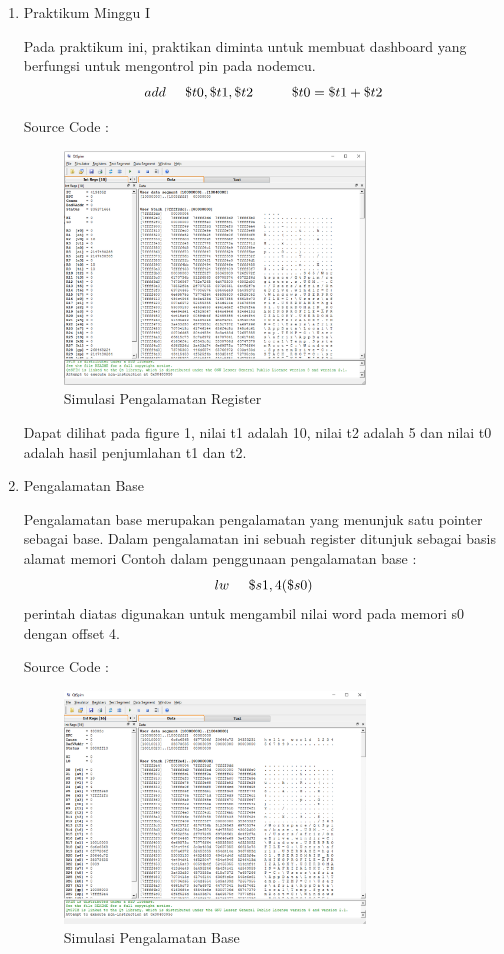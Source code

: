 \documentclass{class}
\begin{document}
    \begin{enumerate}
       
      \item Praktikum Minggu I
      
      Pada praktikum ini, praktikan diminta untuk membuat dashboard yang berfungsi untuk mengontrol pin pada nodemcu.
      $$add \hspace{0.5cm} \$t0, \$t1, \$t2  \hspace{1cm}\$t0 = \$t1 + \$t2$$

      Source Code : 

      
      \begin{figure}[H]
          \centering
              \includegraphics[width=8cm]{gambar/register.png}
              \caption{Simulasi Pengalamatan Register}
              \label{simulasi}
      \end{figure}
      
      Dapat dilihat pada figure 1, nilai t1 adalah 10, nilai t2 adalah 5 dan nilai t0 adalah hasil penjumlahan t1 dan t2.
      \item Pengalamatan Base
      
      Pengalamatan base merupakan pengalamatan yang menunjuk satu pointer sebagai base.
      Dalam pengalamatan ini sebuah register ditunjuk sebagai basis alamat memori
      Contoh dalam penggunaan pengalamatan base : 
      $$lw \hspace{0.5cm} \$s1,4(\$s0)$$
      perintah diatas digunakan untuk mengambil nilai word pada memori s0 dengan offset 4.

      Source Code : 
      
      \begin{figure}[H]
          \centering
              \includegraphics[width=8cm]{gambar/base.png}
              \caption{Simulasi Pengalamatan Base}
              \label{simulasiBase}
      \end{figure}
      

\end{enumerate}
\end{document}
